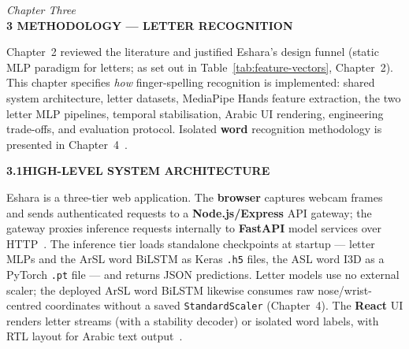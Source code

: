 \newpage
\thispagestyle{plain}

\begin{center}
    \vspace*{0.5cm}
    {\large \textit{Chapter Three}} \\[0.4cm]
    {\Large \textbf{3 \quad METHODOLOGY --- LETTER RECOGNITION}}
\end{center}
\vspace{1in}

\normalsize
{}

\noindent Chapter~2 reviewed the literature and justified Eshara's design funnel (static MLP paradigm for letters; as set out in Table~\ref{tab:feature-vectors}, Chapter~2). This chapter specifies \emph{how} finger-spelling recognition is implemented: shared system architecture, letter datasets, MediaPipe Hands feature extraction, the two letter MLP pipelines, temporal stabilisation, Arabic UI rendering, engineering trade-offs, and evaluation protocol. Isolated \textbf{word} recognition methodology is presented in Chapter~4~\cite{akash2019aslalphabet,arthur2018arasl2018,zhang2020mediapipe}.\par\vspace{0.6cm}

\noindent\textbf{3.1\quad HIGH-LEVEL SYSTEM ARCHITECTURE}\par
{}
\vspace{0.4cm}

\noindent Eshara is a three-tier web application. The \textbf{browser} captures webcam frames and sends authenticated requests to a \textbf{Node.js/Express} API gateway; the gateway proxies inference requests internally to \textbf{FastAPI} model services over HTTP~\cite{rfc9110,fastapi,react}. The inference tier loads standalone checkpoints at startup --- letter MLPs and the ArSL word BiLSTM as Keras \texttt{.h5} files, the ASL word I3D as a PyTorch \texttt{.pt} file --- and returns JSON predictions. Letter models use no external scaler; the deployed ArSL word BiLSTM likewise consumes raw nose/wrist-centred coordinates without a saved \texttt{StandardScaler} (Chapter~4). The \textbf{React} UI renders letter streams (with a stability decoder) or isolated word labels, with RTL layout for Arabic text output~\cite{wcag22}.\par\vspace{0.4cm}

